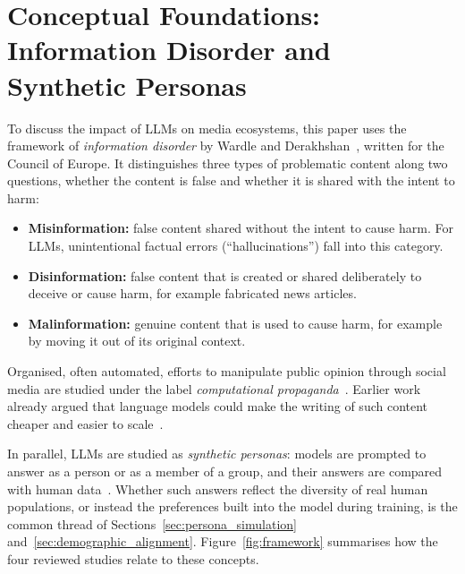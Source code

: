 \section{Conceptual Foundations: Information Disorder and Synthetic Personas}
\label{sec:conceptual_foundations}

To discuss the impact of LLMs on media ecosystems, this paper uses the framework of \emph{information disorder} by Wardle and Derakhshan~\cite{wardle2017information}, written for the Council of Europe. It distinguishes three types of problematic content along two questions, whether the content is false and whether it is shared with the intent to harm:
\begin{itemize}
    \item \textbf{Misinformation:} false content shared without the intent to cause harm. For LLMs, unintentional factual errors (``hallucinations'') fall into this category.
    \item \textbf{Disinformation:} false content that is created or shared deliberately to deceive or cause harm, for example fabricated news articles.
    \item \textbf{Malinformation:} genuine content that is used to cause harm, for example by moving it out of its original context.
\end{itemize}
Organised, often automated, efforts to manipulate public opinion through social media are studied under the label \emph{computational propaganda}~\cite{woolley2018computational}. Earlier work already argued that language models could make the writing of such content cheaper and easier to scale~\cite{buchanan2021truth}.

In parallel, LLMs are studied as \emph{synthetic personas}: models are prompted to answer as a person or as a member of a group, and their answers are compared with human data~\cite{aher2023using, santurkar2023whose}. Whether such answers reflect the diversity of real human populations, or instead the preferences built into the model during training, is the common thread of Sections~\ref{sec:persona_simulation} and~\ref{sec:demographic_alignment}. Figure~\ref{fig:framework} summarises how the four reviewed studies relate to these concepts.


